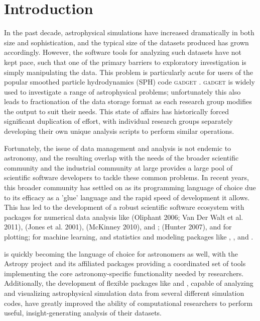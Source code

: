 \section{Introduction}
\label{intro}

In the past decade, astrophysical simulations have increased dramatically in both size and sophistication, and the typical size of the datasets produced has grown accordingly.  
However, the software tools for analyzing such datasets have not kept pace, such that one of the primary barriers to exploratory investigation is simply manipulating the data.  
This problem is particularly acute for users of the popular smoothed particle hydrodynamics (SPH) code \textsc{gadget} \citep{SpringelYoshidaWhite2001,Springel2005}.  
\textsc{gadget} is widely used to investigate a range of astrophysical problems; unfortunately this also leads to fractionation of the data storage format as each research group modifies the output to suit their needs.
This state of affairs has historically forced significant duplication of effort, with individual research groups separately developing their own unique analysis scripts to perform similar operations.

Fortunately, the issue of data management and analysis is not endemic to astronomy, and the resulting overlap with the needs of the broader scientific community and the industrial community at large provides a large pool of scientific software developers to tackle these common problems.
In recent years, this broader community has settled on  as its programming language of choice due to its efficacy as a 'glue' language and the rapid speed of development it allows.  
This has led to the development of a robust scientific software ecosystem with packages for numerical data analysis like  (Oliphant 2006; Van Der Walt et al. 2011),  (Jones et al. 2001),  (McKinney 2010), and ;  (Hunter 2007), and  for plotting;  for machine learning, and statistics and modeling packages like , , and  \citep{Foreman-Mackeyetal2013}.

 is quickly becoming the language of choice for astronomers as well, with the Astropy project \citep{Robitailleetal2013} and its affiliated packages providing a coordinated set of tools implementing the core astronomy-specific functionality needed by researchers. 
Additionally, the development of flexible  packages like  \citep{Turketal2011} and  \citep{Pontzenetal2013}, capable of analyzing and visualizing astrophysical simulation data from several different simulation codes, have greatly improved the ability of computational researchers to perform useful, insight-generating analysis of their datasets.

